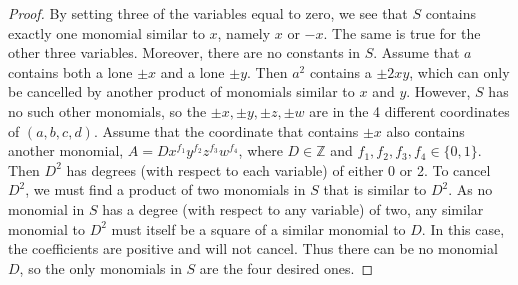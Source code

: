 \documentclass[12pt]{article}
\theoremstyle{definition}
\theoremstyle{remark}
\newcommand{\Zzz}{\mathbb Z}
\numberwithin{equation}{section}
\begin{document}
\begin{proof}
By setting three of the variables equal to zero, we see that \( S \) contains
exactly one monomial similar to \( x \), namely \( x\) or \( -x \). The same is true for
the other three variables. Moreover, there are no constants in \( S \). Assume that
\( a \) contains both a lone \( \pm x \) and a lone \( \pm y \). Then \(a^2\) contains
a \( \pm 2xy \), which can only be cancelled by another product of monomials similar to
\( x \) and \(y\). However, \( S \) has no such other monomials,
so the \( \pm x, \pm y, \pm z, \pm w \) are in the 4 different coordinates of
\( (a, b, c, d) \). Assume that the coordinate that contains \( \pm x \) also contains
another monomial, \( A = Dx^{f_1}y^{f_2}z^{f_3}w^{f_4}\), where \( D \in \Zzz \)
and \( f_1,f_2,f_3,f_4 \in \{0,1\} \). Then \( D^2 \) has degrees (with respect to
each variable) of either 0 or 2. To cancel \( D^2 \), we must find a product of two
monomials in \( S \) that is similar to \( D^2 \). As no monomial in \( S \) has a degree
(with respect to any variable) of two, any similar monomial to \( D^2 \) must itself be
a square of a similar monomial to \( D \). In this case, the coefficients are
positive and will not cancel. Thus there can be no monomial \( D \), so the only monomials
in \( S \) are the four desired ones.
\end{proof}
\end{document}
